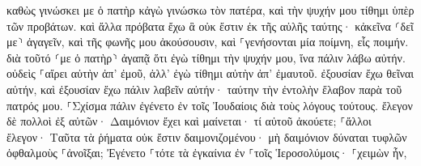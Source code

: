 \documentclass{openreader}
\begin{document}
καθὼς γινώσκει με ὁ πατὴρ κἀγὼ γινώσκω τὸν πατέρα, καὶ τὴν ψυχήν μου τίθημι ὑπὲρ τῶν προβάτων. 
καὶ ἄλλα πρόβατα ἔχω ἃ οὐκ ἔστιν ἐκ τῆς αὐλῆς ταύτης· κἀκεῖνα ⸂δεῖ με⸃ ἀγαγεῖν, καὶ τῆς φωνῆς μου ἀκούσουσιν, καὶ ⸀γενήσονται μία ποίμνη, εἷς ποιμήν. 
διὰ τοῦτό ⸂με ὁ πατὴρ⸃ ἀγαπᾷ ὅτι ἐγὼ τίθημι τὴν ψυχήν μου, ἵνα πάλιν λάβω αὐτήν. 
οὐδεὶς ⸀αἴρει αὐτὴν ἀπ’ ἐμοῦ, ἀλλ’ ἐγὼ τίθημι αὐτὴν ἀπ’ ἐμαυτοῦ. ἐξουσίαν ἔχω θεῖναι αὐτήν, καὶ ἐξουσίαν ἔχω πάλιν λαβεῖν αὐτήν· ταύτην τὴν ἐντολὴν ἔλαβον παρὰ τοῦ πατρός μου. 
⸀Σχίσμα πάλιν ἐγένετο ἐν τοῖς Ἰουδαίοις διὰ τοὺς λόγους τούτους. 
ἔλεγον δὲ πολλοὶ ἐξ αὐτῶν· Δαιμόνιον ἔχει καὶ μαίνεται· τί αὐτοῦ ἀκούετε; 
⸀ἄλλοι ἔλεγον· Ταῦτα τὰ ῥήματα οὐκ ἔστιν δαιμονιζομένου· μὴ δαιμόνιον δύναται τυφλῶν ὀφθαλμοὺς ⸀ἀνοῖξαι; 
Ἐγένετο ⸀τότε τὰ ἐγκαίνια ἐν ⸀τοῖς Ἱεροσολύμοις· ⸀χειμὼν ἦν, 
\end{document}
